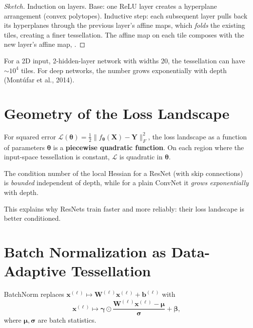 \begin{proof}[Sketch]
Induction on layers. Base: one ReLU layer creates a hyperplane arrangement (convex polytopes). Inductive step: each subsequent layer pulls back its hyperplanes through the previous layer's affine maps, which \emph{folds} the existing tiles, creating a finer tessellation. The affine map on each tile composes with the new layer's affine map, \cite{balestriero2025geometry}.
\end{proof}

\begin{example}
For a 2D input, 2-hidden-layer network with widths 20, the tessellation can have $\sim 10^4$ tiles. For deep networks, the number grows exponentially with depth (Montúfar et al., 2014).
\end{example}

\section{Geometry of the Loss Landscape}
\label{sec:dl:loss}

For squared error $\mathcal{L}(\bm{\theta}) = \frac{1}{2}\|f_{\bm{\theta}}(\bm{X}) - \bm{Y}\|_F^2$, the loss landscape as a function of parameters $\bm{\theta}$ is a \textbf{piecewise quadratic function}. On each region where the input-space tessellation is constant, $\mathcal{L}$ is quadratic in $\bm{\theta}$.

\begin{theorem}
The condition number of the local Hessian for a ResNet (with skip connections) is \emph{bounded} independent of depth, while for a plain ConvNet it \emph{grows exponentially} with depth.
\end{theorem}

This explains why ResNets train faster and more reliably: their loss landscape is better conditioned.

\section{Batch Normalization as Data-Adaptive Tessellation}
\label{sec:dl:batchnorm}

BatchNorm replaces $\bm{x}^{(\ell)} \mapsto \bm{W}^{(\ell)}\bm{x}^{(\ell)} + \bm{b}^{(\ell)}$ with
\[
\bm{x}^{(\ell)} \mapsto \bm{\gamma} \odot \frac{\bm{W}^{(\ell)}\bm{x}^{(\ell)} - \bm{\mu}}{\bm{\sigma}} + \bm{\beta},
\]
where $\bm{\mu}, \bm{\sigma}$ are batch statistics.

